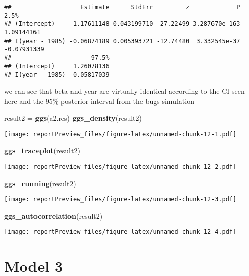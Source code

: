 \documentclass[]{article}
\newenvironment{Shaded}{\begin{snugshade}}{\end{snugshade}}
\newcommand{\KeywordTok}[1]{\textcolor[rgb]{0.13,0.29,0.53}{\textbf{#1}}}
\newcommand{\StringTok}[1]{\textcolor[rgb]{0.31,0.60,0.02}{#1}}
\newcommand{\NormalTok}[1]{#1}
\begin{document}
\begin{verbatim}
##                   Estimate      StdErr         z             P        2.5%
## (Intercept)     1.17611148 0.043199710  27.22499 3.287670e-163  1.09144161
## I(year - 1985) -0.06874189 0.005393721 -12.74480  3.332545e-37 -0.07931339
##                      97.5%
## (Intercept)     1.26078136
## I(year - 1985) -0.05817039
\end{verbatim}

we can see that beta and year are virtually identical according to the
CI seen here and the 95\% posterior interval from the bugs simulation

\begin{Shaded}
\begin{Highlighting}[]
\NormalTok{result2 =}\StringTok{ }\KeywordTok{ggs}\NormalTok{(a2.res)}
\KeywordTok{ggs_density}\NormalTok{(result2)}
\end{Highlighting}
\end{Shaded}

\texttt{[image: reportPreview\_files/figure-latex/unnamed-chunk-12-1.pdf]}

\begin{Shaded}
\begin{Highlighting}[]
\KeywordTok{ggs_traceplot}\NormalTok{(result2)}
\end{Highlighting}
\end{Shaded}

\texttt{[image: reportPreview\_files/figure-latex/unnamed-chunk-12-2.pdf]}

\begin{Shaded}
\begin{Highlighting}[]
\KeywordTok{ggs_running}\NormalTok{(result2)}
\end{Highlighting}
\end{Shaded}

\texttt{[image: reportPreview\_files/figure-latex/unnamed-chunk-12-3.pdf]}

\begin{Shaded}
\begin{Highlighting}[]
\KeywordTok{ggs_autocorrelation}\NormalTok{(result2)}
\end{Highlighting}
\end{Shaded}

\texttt{[image: reportPreview\_files/figure-latex/unnamed-chunk-12-4.pdf]}

\section{Model 3}\label{model-3}
\end{document}
